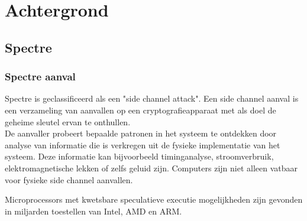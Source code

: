 
\chapter{Achtergrond}



\section{Spectre}

\subsection{Spectre aanval}
Spectre is geclassificeerd als een "side channel attack".
Een side channel aanval is een verzameling van aanvallen op een cryptografieapparaat met als doel de geheime sleutel ervan te onthullen. \\De aanvaller probeert bepaalde patronen in het systeem te ontdekken door analyse van informatie die is verkregen uit de fysieke implementatie van het systeem. Deze informatie kan bijvoorbeeld timinganalyse, stroomverbruik, elektromagnetische lekken of zelfs geluid zijn. \parencite{Touhafi2011}
Computers zijn niet alleen vatbaar voor fysieke side channel aanvallen.

Microprocessors met kwetsbare speculatieve executie mogelijkheden zijn gevonden in miljarden toestellen van Intel, AMD en ARM.

